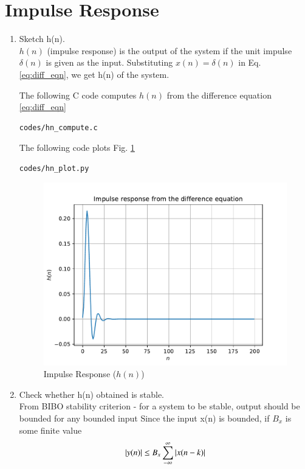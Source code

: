 \documentclass[journal,12pt,twocolumn]{IEEEtran}
\renewcommand\thesection{\arabic{section}}
\begin{document}
\section{Impulse Response}
\begin{enumerate}[label=\thesection.\arabic*,ref=\thesection.\theenumi]
\item
Sketch h(n).
\label{prob:h(n)}
\\
\solution
$h(n)$ (impulse response) is the output of the system if the unit impulse $\delta(n)$ is given as the input. Substituting $x(n)= \delta(n)$ in Eq. \eqref{eq:diff_eqn}, we get h(n) of the system.

The following C code computes $h(n)$ from the difference equation \eqref{eq:diff_eqn}
\begin{lstlisting}
codes/hn_compute.c
\end{lstlisting}
The following code plots Fig. \ref{fig:h(n)}
\begin{lstlisting}
codes/hn_plot.py
\end{lstlisting}
\begin{figure}[!ht]
\centering
\includegraphics[width=\columnwidth]{./figs/hn}
\caption{Impulse Response ($h(n)$)}
\label{fig:h(n)}
\end{figure}
\item Check whether h(n) obtained is stable.
\\
\solution
From BIBO stability criterion - for a system to be stable, output should be bounded for any bounded input
Since the input x(n) is bounded, if $B_{x}$ is some finite value
\begin{equation}
\abs{y(n)} \leq B_{x}\sum_{-\infty}^{\infty} \abs{x(n-k)}

\end{equation}
\end{enumerate}
\end{document}
